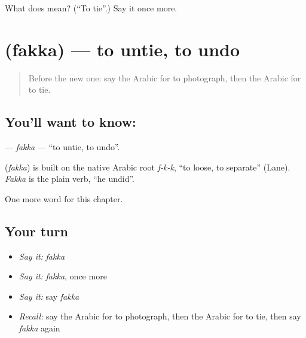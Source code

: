 \begin{tcolorbox}[breakable,colback=teal!4,colframe=teal!35!black,title={Before you move on}]
What does  mean? (\textquotedblleft{}To tie\textquotedblright{}.) Say it once more.
\end{tcolorbox}
\section[\texorpdfstring{\ar{فك} (fakka)}{فك (fakka)}]{ (fakka) — to untie, to undo}

\label{lesson:AR-C229-fakka}



\begin{quote}
Before the new one: say the Arabic for to photograph, then the Arabic for to tie.
\end{quote}

\subsection*{You'll want to know: }
\textbf{} — \emph{fakka} — \textquotedblleft{}to untie, to undo\textquotedblright{}.

\begin{cousinweb}
\textbf{} (\emph{fakka}) is built on the native Arabic root \emph{f-k-k}, \textquotedblleft{}to loose, to separate\textquotedblright{} (Lane). \emph{Fakka} is the plain verb, \textquotedblleft{}he undid\textquotedblright{}.
\end{cousinweb}

\begin{grammarlens}[title={What you've built}]
One more word for this chapter.
\end{grammarlens}

\subsection*{Your turn}
\begin{itemize}
\raggedright
  \item \emph{Say it:} \emph{fakka}
  \item \emph{Say it:} \emph{fakka}, once more
  \item \emph{Say it:} say \emph{fakka}
  \item \emph{Recall:} say the Arabic for to photograph, then the Arabic for to tie, then say \emph{fakka} again
\end{itemize}

